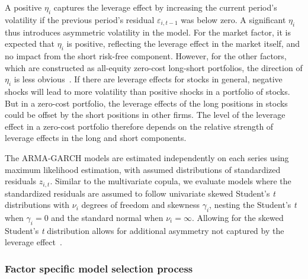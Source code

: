 A positive $\eta_i$ captures the leverage effect by increasing the current period's volatility if the previous period's residual $\varepsilon_{i,t-1}$ was below zero. A significant $\eta_i$ thus introduces asymmetric volatility in the model. For the market factor, it is expected that $\eta_i$ is positive, reflecting the leverage effect in the market itself, and no impact from the short risk-free component. However, for the other factors, which are constructed as all-equity zero-cost long-short portfolios, the direction of $\eta_i$ is less obvious~\autocite{ChristoffersenLanglois2013}. If there are leverage effects for stocks in general, negative shocks will lead to more volatility than positive shocks in a portfolio of stocks. But in a zero-cost portfolio, the leverage effects of the long positions in stocks could be offset by the short positions in other firms. The level of the leverage effect in a zero-cost portfolio therefore depends on the relative strength of leverage effects in the long and short components.

The ARMA-GARCH models are estimated independently on each series using maximum likelihood estimation, with assumed distributions of standardized residuals $z_{i,t}$. Similar to the multivariate copula, we evaluate models where the standardized residuals are assumed to follow univariate skewed Student's \emph{t} distributions with $\nu_i$ degrees of freedom and skewness $\gamma_i$, nesting the Student's \emph{t} when $\gamma_i = 0$ and the standard normal when $\nu_i = \infty$. Allowing for the skewed Student's \emph{t} distribution allows for additional asymmetry not captured by the leverage effect~\autocite{ChristoffersenErrunzaJacobLanglois2012}.

\subsubsection{Factor specific model selection process}

